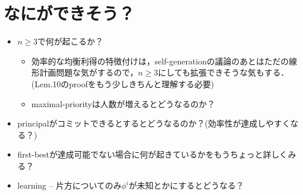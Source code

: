 \documentclass[11pt,a4paper,dvipdfmx]{article}
\newcommand{\1}{\mathbbm{1}}
\begin{document}
\section*{なにができそう？}
\begin{itemize}
	\item $n \geq 3$で何が起こるか？
	\begin{itemize}
		\item 効率的な均衡利得の特徴付けは，self-generationの議論のあとはただの線形計画問題な気がするので，$n \geq 3$にしても拡張できそうな気もする．(Lem.10のproofをもう少しきちんと理解する必要)
		\item maximal-priorityは人数が増えるとどうなるのか？
	\end{itemize}
	\item principalがコミットできるとするとどうなるのか？(効率性が達成しやすくなる？)
	\item first-bestが達成可能でない場合に何が起きているかをもうちょっと詳しくみる？
	\item learning -- 片方についてのみ$\phi^i$が未知とかにするとどうなる？
\end{itemize}
\end{document}

